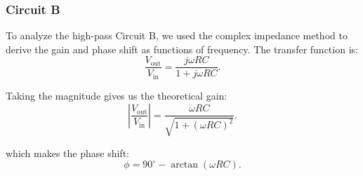 \documentclass{article}
\begin{document}
\subsubsection{Circuit B}

To analyze the high-pass Circuit B, we used the complex impedance method to 
derive the gain and phase shift as functions of frequency. The transfer 
function is: 
\begin{equation}
\frac{V_\text{out}}{V_\text{in}} = \frac{j\omega RC}{1 + j\omega RC}.
\end{equation}

\noindent Taking the magnitude gives us the theoretical gain:
\begin{equation}
\left|\frac{V_\text{out}}{V_\text{in}}\right| = \frac{\omega RC}{\sqrt{1 + (\omega RC)^2}}.
\end{equation}

\noindent which makes the phase shift:
\begin{equation}
\phi = 90^\circ-\arctan(\omega RC).
\end{equation}
\end{document}
